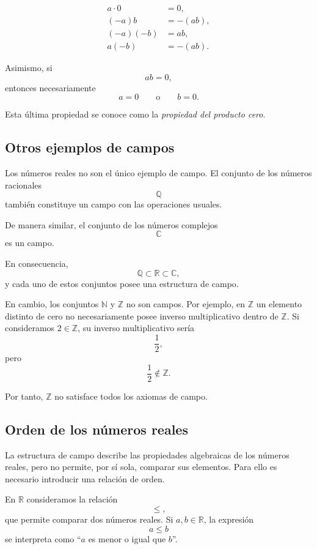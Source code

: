 \documentclass[12pt]{article}
\begin{document}
\begin{align*}
a\cdot0 &= 0,\\
(-a)b &= -(ab),\\
(-a)(-b) &= ab,\\
a(-b) &= -(ab).
\end{align*}

Asimismo, si
\[
ab=0,
\]
entonces necesariamente
\[
a=0
\qquad\text{o}\qquad
b=0.
\]

Esta última propiedad se conoce como la \emph{propiedad del producto cero}.

\subsection*{Otros ejemplos de campos}

Los números reales no son el único ejemplo de campo. El conjunto de los
números racionales
\[
\mathbb{Q}
\]
también constituye un campo con las operaciones usuales.

De manera similar, el conjunto de los números complejos
\[
\mathbb{C}
\]
es un campo.

En consecuencia,
\[
\mathbb{Q}\subset\mathbb{R}\subset\mathbb{C},
\]
y cada uno de estos conjuntos posee una estructura de campo.

En cambio, los conjuntos $\mathbb{N}$ y $\mathbb{Z}$ no son campos. Por
ejemplo, en $\mathbb{Z}$ un elemento distinto de cero no necesariamente
posee inverso multiplicativo dentro de $\mathbb{Z}$. Si consideramos
$2\in\mathbb{Z}$, su inverso multiplicativo sería
\[
\frac{1}{2},
\]
pero
\[
\frac{1}{2}\notin\mathbb{Z}.
\]

Por tanto, $\mathbb{Z}$ no satisface todos los axiomas de campo.

\subsection{Orden de los números reales}

La estructura de campo describe las propiedades algebraicas de los números
reales, pero no permite, por sí sola, comparar sus elementos. Para ello es
necesario introducir una relación de orden.

En $\mathbb{R}$ consideramos la relación
\[
\leq,
\]
que permite comparar dos números reales. Si $a,b\in\mathbb{R}$, la expresión
\[
a\leq b
\]
se interpreta como ``$a$ es menor o igual que $b$''.
\end{document}
